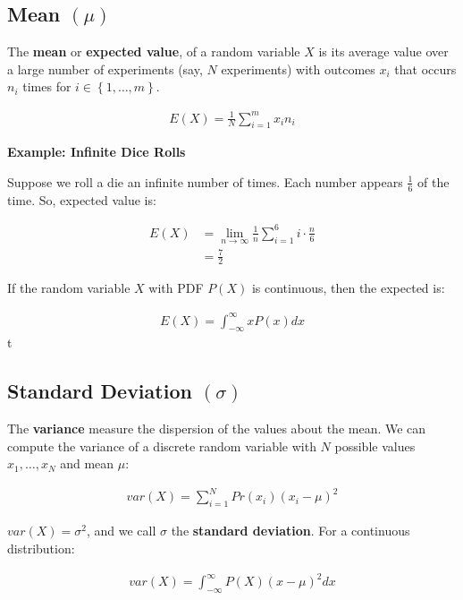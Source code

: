 \documentclass[11pt]{article}
\begin{document}
\subsection{Mean \(\left( \mu \right)\)}
\label{sec:orgd8a2859}
The \textbf{mean} or \textbf{expected value}, of a random variable \(X\) is its average value over a large number of experiments (say, \(N\) experiments) with outcomes \(x_{i}\) that occurs \(n_{i}\) times for \(i \in \left\lbrace 1, \ldots, m \right\rbrace\).

\begin{align*}
    E\left( X \right) = \frac{1}{N}\sum_{i=1}^{m}x_{i}n_{i}
\end{align*}

\textbf{Example: Infinite Dice Rolls}

Suppose we roll a die an infinite number of times. Each number appears \(\frac{1}{6}\) of the time. So, expected value is:

\begin{align*}
    E\left( X \right) &= \lim_{n \rightarrow \infty} \frac{1}{n}\sum_{i=1}^{6} i \cdot \frac{n}{6} \\
    &= \frac{7}{2}
\end{align*}

If the random variable \(X\) with PDF \(P\left( X \right)\) is continuous, then the expected is:

\begin{align*}
    E\left( X \right) = \int_{-\infty}^{\infty} xP\left( x \right)dx
\end{align*}
t
\subsection{Standard Deviation \(\left( \sigma \right)\)}
\label{sec:org6ae4dde}
The \textbf{variance} measure the dispersion of the values about the mean. We can compute the variance of a discrete random variable with \(N\) possible values \(x_{1}, \ldots, x_{N}\) and mean \(\mu\):

\begin{align*}
    var\left( X \right) = \sum_{i=1}^{N} Pr\left( x_{i} \right)\left( x_{i} - \mu \right)^{2}
\end{align*}

\(var\left( X \right) = \sigma^{2}\), and we call \(\sigma\) the \textbf{standard deviation}. For a continuous distribution:

\begin{align*}
    var\left( X \right) = \int_{-\infty}^{\infty} P\left( X \right)\left( x - \mu \right)^{2}dx
\end{align*}
\end{document}
